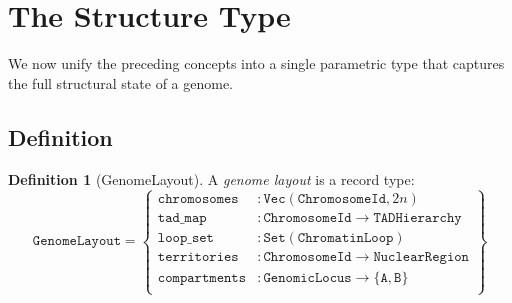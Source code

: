 \documentclass[12pt,a4paper]{article}
\theoremstyle{plain}
\theoremstyle{definition}
\newtheorem{definition}[theorem]{Definition}
\begin{document}
\section{The Structure Type}\label{sec:structure-type}

We now unify the preceding concepts into a single parametric type that captures the full structural state of a genome.

\subsection{Definition}

\begin{definition}[GenomeLayout]\label{def:genome-layout}
A \emph{genome layout} is a record type:
\[
  \texttt{GenomeLayout} = \left\{
    \begin{array}{ll}
      \texttt{chromosomes} &: \texttt{Vec}(\texttt{ChromosomeId}, 2n) \\
      \texttt{tad\_map} &: \texttt{ChromosomeId} \to \texttt{TADHierarchy} \\
      \texttt{loop\_set} &: \texttt{Set}(\texttt{ChromatinLoop}) \\
      \texttt{territories} &: \texttt{ChromosomeId} \to \texttt{NuclearRegion} \\
      \texttt{compartments} &: \texttt{GenomicLocus} \to \{\texttt{A}, \texttt{B}\} \\
    \end{array}
  \right\}
\]
\end{definition}
\end{document}
